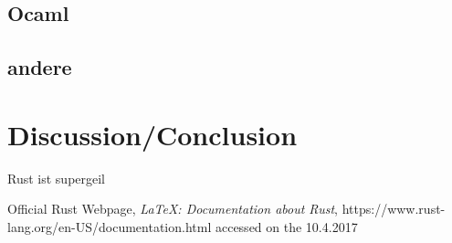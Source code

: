 \documentclass[a4paper,10pt]{scrartcl}
\begin{document}
\subsection{Ocaml}
\subsection{andere}
\section{Discussion/Conclusion}
Rust ist supergeil

\begin{thebibliography}{9}
  Official Rust Webpage,
  \emph{\LaTeX: Documentation about Rust},
  https://www.rust-lang.org/en-US/documentation.html
  accessed on the 10.4.2017
\end{thebibliography}
\end{document}
